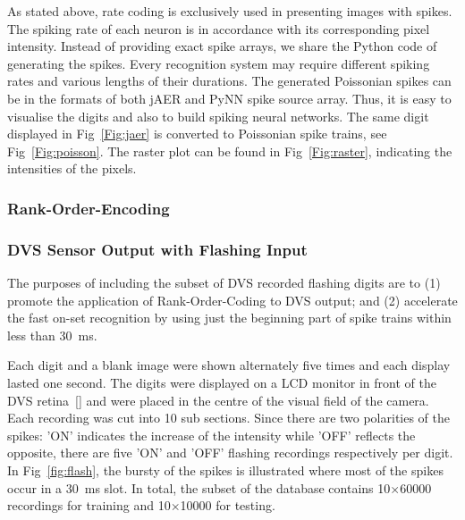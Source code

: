 	As stated above, rate coding is exclusively used in presenting images with spikes.
	The spiking rate of each neuron is in accordance with its corresponding pixel intensity.
	Instead of providing exact spike arrays, we share the Python code of generating the spikes.
	Every recognition system may require different spiking rates and various lengths of their durations.
	The generated Poissonian spikes can be in the formats of both jAER and PyNN spike source array.
	Thus, it is easy to visualise the digits and also to build spiking neural networks.
	The same digit displayed in Fig~\ref{Fig:jaer} is converted to Poissonian spike trains, see Fig~\ref{Fig:poisson}.
	The raster plot can be found in Fig~\ref{Fig:raster}, indicating the intensities of the pixels.

	
	\subsubsection{Rank-Order-Encoding}
  
	\subsubsection{DVS Sensor Output with Flashing Input}
	\label{subsec_flash}
	The purposes of including the subset of DVS recorded flashing digits are to (1) promote the application of Rank-Order-Coding to DVS output; and (2) accelerate the fast on-set recognition by using just the beginning part of spike trains within less than 30~ms.
	
	Each digit and a blank image were shown alternately five times and each display lasted one second.
	The digits were displayed on a LCD monitor in front of the DVS retina~[\cite{serrano-gotarredona_128_2013}] and were placed in the centre of the visual field of the camera.
	Each recording was cut into 10 sub sections.
	Since there are two polarities of the spikes: 'ON' indicates the increase of the intensity while 'OFF' reflects the opposite, there are five 'ON' and 'OFF' flashing recordings respectively per digit.
	In Fig~\ref{fig:flash}, the bursty of the spikes is illustrated where most of the spikes occur in a 30~ms slot. 
	In total, the subset of the database contains 10$\times$60000 recordings for training and 10$\times$10000 for testing.

